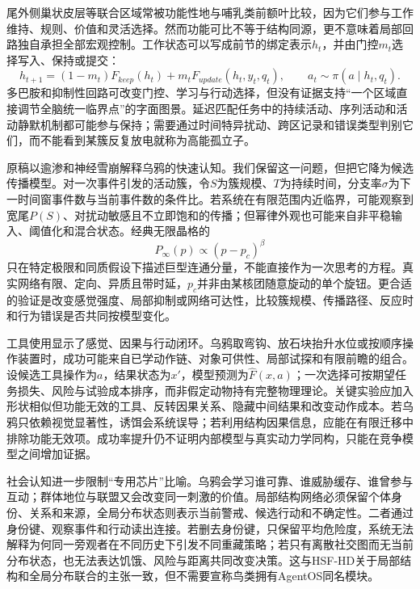 尾外侧巢状皮层等联合区域常被功能性地与哺乳类前额叶比较，因为它们参与工作维持、规则、价值和灵活选择。然而功能可比不等于结构同源，更不意味着局部回路独自承担全部宏观控制。工作状态可以写成前节的绑定表示$h_t$，并由门控$m_t$选择写入、保持或提交：
\begin{equation}
 h_{t+1}=(1-m_t)F_{keep}(h_t)+m_tF_{update}(h_t,y_t,q_t),\qquad a_t\sim\pi(a\mid h_t,q_t).
\end{equation}
多巴胺和抑制性回路可改变门控、学习与行动选择，但没有证据支持“一个区域直接调节全脑统一临界点”的字面图景。延迟匹配任务中的持续活动、序列活动和活动静默机制都可能参与保持；需要通过时间特异扰动、跨区记录和错误类型判别它们，而不能看到某簇反复放电就称为高能孤立子。

原稿以逾渗和神经雪崩解释乌鸦的快速认知。我们保留这一问题，但把它降为候选传播模型。对一次事件引发的活动簇，令$S$为簇规模、$T$为持续时间，分支率$\sigma$为下一时间窗事件数与当前事件数的条件比。若系统在有限范围内近临界，可能观察到宽尾$P(S)$、对扰动敏感且不立即饱和的传播；但幂律外观也可能来自非平稳输入、阈值化和混合状态。经典无限晶格的
\begin{equation}
 P_\infty(p)\propto(p-p_c)^\beta
\end{equation}
只在特定极限和同质假设下描述巨型连通分量，不能直接作为一次思考的方程。真实网络有限、定向、异质且带时延，$p_c$并非由某核团随意旋动的单个旋钮。更合适的验证是改变感觉强度、局部抑制或网络可达性，比较簇规模、传播路径、反应时和行为错误是否共同按模型变化。

工具使用显示了感觉、因果与行动闭环。乌鸦取弯钩、放石块抬升水位或按顺序操作装置时，成功可能来自已学动作链、对象可供性、局部试探和有限前瞻的组合。设候选工具操作为$a$，结果状态为$x'$，模型预测为$\hat F(x,a)$；一次选择可按期望任务损失、风险与试验成本排序，而非假定动物持有完整物理理论。关键实验应加入形状相似但功能无效的工具、反转因果关系、隐藏中间结果和改变动作成本。若乌鸦只依赖视觉显著性，诱饵会系统误导；若利用结构因果信息，应能在有限迁移中排除功能无效项。成功率提升仍不证明内部模型与真实动力学同构，只能在竞争模型之间增加证据。

社会认知进一步限制“专用芯片”比喻。乌鸦会学习谁可靠、谁威胁缓存、谁曾参与互动；群体地位与联盟又会改变同一刺激的价值。局部结构网络必须保留个体身份、关系和来源，全局分布状态则表示当前警戒、候选行动和不确定性。二者通过身份键、观察事件和行动读出连接。若删去身份键，只保留平均危险度，系统无法解释为何同一旁观者在不同历史下引发不同重藏策略；若只有离散社交图而无当前分布状态，也无法表达饥饿、风险与距离共同改变决策。这与HSF-HD关于局部结构和全局分布联合的主张一致，但不需要宣称鸟类拥有AgentOS同名模块。

